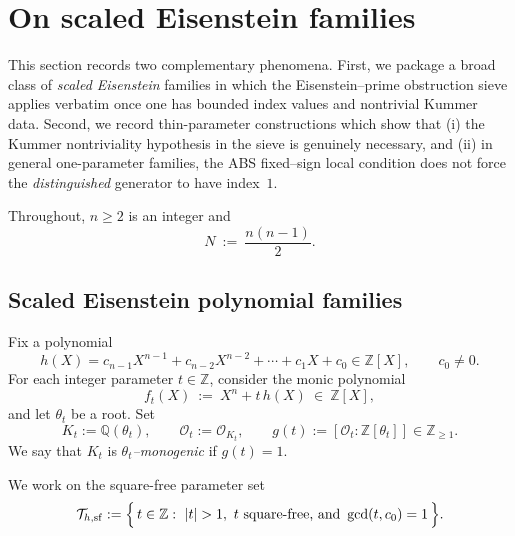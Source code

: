 \documentclass[11pt,letterpaper]{amsart}
\newcommand{\Z}{\mathbb{Z}}
\newcommand{\Q}{\mathbb{Q}}
\newcommand{\Ocal}{\mathcal{O}}
\theoremstyle{plain}
\theoremstyle{definition}
\theoremstyle{remark}
\theoremstyle{plain}
\begin{document}
\section{On scaled Eisenstein families}
\label{sec:examples-counterexamples}

This section records two complementary phenomena.
First, we package a broad class of \emph{scaled Eisenstein} families in which the Eisenstein--prime
obstruction sieve applies verbatim once one has bounded index values and nontrivial Kummer data.
Second, we record thin-parameter constructions which show that (i) the Kummer nontriviality hypothesis
in the sieve is genuinely necessary, and (ii) in general one-parameter families, the \textsc{ABS}
fixed--sign local condition does not force the \emph{distinguished} generator to have index~$1$.

Throughout, $n\ge 2$ is an integer and
\[
N \ :=\ \frac{n(n-1)}2.
\]

\subsection{Scaled Eisenstein polynomial families}
\label{subsec:scaled-family}

Fix a polynomial
\[
h(X)=c_{n-1}X^{n-1}+c_{n-2}X^{n-2}+\cdots+c_1X+c_0\in\Z[X],
\qquad c_0\neq 0.
\]
For each integer parameter $t\in\Z$, consider the monic polynomial
\[
f_t(X)\ :=\ X^n+t\,h(X)\ \in\ \Z[X],
\]
and let $\theta_t$ be a root.  Set
\[
K_t:=\Q(\theta_t),\qquad \Ocal_t:=\Ocal_{K_t},\qquad g(t):=[\Ocal_t:\Z[\theta_t]]\in\Z_{\ge 1}.
\]
We say that $K_t$ is \emph{$\theta_t$--monogenic} if $g(t)=1$.

We work on the square-free parameter set
\[
\mathcal{T}_{h,\mathrm{sf}}
:=\Bigl\{\,t\in\Z:\ |t|>1,\ t\ \text{square-free, and }\gcd(t,c_0)=1\,\Bigr\}.
\]
\end{document}
